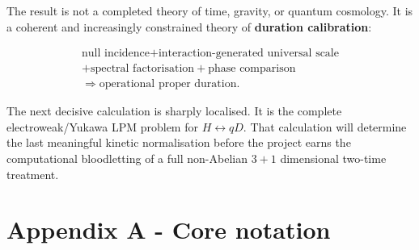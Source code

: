 \documentclass[
]{article}
\begin{document}
The result is not a completed theory of time, gravity, or quantum
cosmology. It is a coherent and increasingly constrained theory of
\textbf{duration calibration}:

\[
\boxed{
\begin{gathered}
\text{null incidence}
+\text{interaction-generated universal scale}\\
+\text{spectral factorisation}
+\text{phase comparison}\\
\Longrightarrow
\text{operational proper duration}.
\end{gathered}
}
\]

The next decisive calculation is sharply localised. It is the complete
electroweak/Yukawa LPM problem for \(H\leftrightarrow qD\). That
calculation will determine the last meaningful kinetic normalisation
before the project earns the computational bloodletting of a full
non-Abelian \(3+1\) dimensional two-time treatment.

\newpage

\section{Appendix A - Core notation}\label{appendix-a---core-notation}
\end{document}
